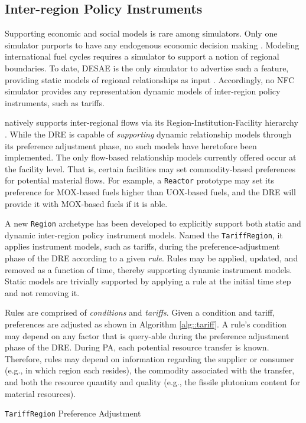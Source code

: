 
\subsection{Inter-region Policy Instruments}\label{meth:tariff}

Supporting economic and social models is rare among simulators. Only one
simulator purports to have any endogenous economic decision making
\cite{van_den_durpel_daness_2009}. Modeling international fuel cycles requires a
simulator to support a notion of regional boundaries. To date, DESAE is the only
simulator to advertise such a feature, providing static models of regional
relationships as input \cite{andrianova_desae_2008}. Accordingly, no NFC
simulator provides any representation dynamic models of inter-region policy
instruments, such as tariffs.

\Cyclus natively supports inter-regional flows via its
Region-Institution-Facility hierarchy \cite{huff_cyclus_2015}. While the DRE is
capable of \textit{supporting} dynamic relationship models through its
preference adjustment phase, no such models have heretofore been
implemented. The only flow-based relationship models currently offered occur at
the facility level. That is, certain facilities may set commodity-based
preferences for potential material flows. For example, a \texttt{Reactor}
prototype may set its preference for MOX-based fuels higher than UOX-based
fuels, and the DRE will provide it with MOX-based fuels if it is able.

A new \texttt{Region} archetype has been developed to explicitly support both
static and dynamic inter-region policy instrument models. Named the
\texttt{TariffRegion}, it applies instrument models, such as tariffs, during the
preference-adjustment phase of the DRE according to a given \textit{rule}. Rules
may be applied, updated, and removed as a function of time, thereby supporting
dynamic instrument models. Static models are trivially supported by applying a
rule at the initial time step and not removing it.

Rules are comprised of \textit{conditions} and \textit{tariffs}. Given a
condition and tariff, preferences are adjusted as shown in Algorithm
\ref{alg::tariff}. A rule's condition may depend on any factor that is
query-able during the preference adjustment phase of the DRE. During PA, each
potential resource transfer is known. Therefore, rules may depend on information
regarding the supplier or consumer (e.g., in which region each resides), the
commodity associated with the transfer, and both the resource quantity and
quality (e.g., the fissile plutonium content for material resources).


\begin{algorithm}[!h]
 \SetAlgoLined
 \caption{\texttt{TariffRegion} Preference Adjustment}\label{alg::tariff}
\end{algorithm}


